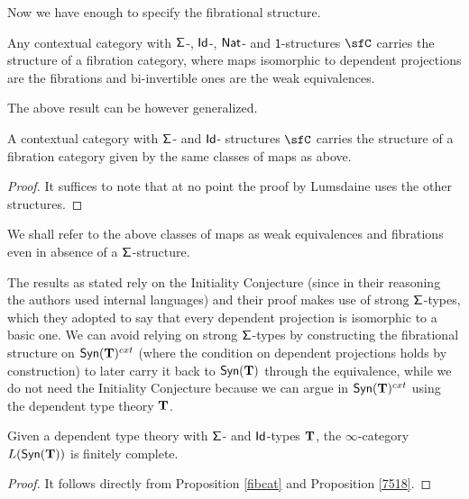 Now we have enough to specify the fibrational structure.

\begin{prop}
  Any contextual category with $\operatorname{\mathsf{\Sigma}}$-, $\operatorname{\mathsf{Id}}$-, $\operatorname{\mathsf{Nat}}$- and
  $\mathsf{1}$-structures $\sfC$ carries the structure of a fibration category,
  where maps isomorphic to dependent projections are the fibrations and
  bi-invertible ones are the weak equivalences.
\end{prop}

The above result can be however generalized.

\begin{prop}\label{fibcat}
  A contextual category with $\operatorname{\mathsf{\Sigma}}$- and $\operatorname{\mathsf{Id}}$- structures $\sfC$ carries
  the structure of a fibration category given by the same classes of maps as
  above.
\end{prop}
\begin{proof}
  It suffices to note that at no point the proof by Lumsdaine uses the other
  structures.
\end{proof}

\begin{rmk}
  We shall refer to the above classes of maps as weak equivalences and
  fibrations even in absence of a $\operatorname{\mathsf{\Sigma}}$-structure.
\end{rmk}

\begin{rmk}
  The results as stated rely on the Initiality Conjecture (since in their
  reasoning the authors used internal languages) and their proof makes use of
  strong $\operatorname{\mathsf{\Sigma}}$-types, which they adopted to say that every dependent
  projection is isomorphic to a basic one. We
  can avoid relying on strong $\operatorname{\mathsf{\Sigma}}$-types by constructing the fibrational
  structure on $\mathsf{Syn}(\mathbf{T})^{cxt}$ (where the condition on dependent projections
  holds by construction) to later carry it back to $\mathsf{Syn}(\mathbf{T})$ through the
  equivalence, while we do not need the Initiality Conjecture because we can
  argue in $\mathsf{Syn}(\mathbf{T})^{cxt}$ using the dependent type theory $\operatorname{\mathbf{T}}$.
\end{rmk}

\begin{cor}\label{fincompl1}
  Given a dependent type theory with $\operatorname{\mathsf{\Sigma}}$- and $\operatorname{\mathsf{Id}}$-types $\operatorname{\mathbf{T}}$, the
  $\infty$-category $L(\mathsf{Syn}(\mathbf{T}))$ is finitely complete.
\end{cor}
\begin{proof}
  It follows directly from Proposition \ref{fibcat} and Proposition \ref{7518}.
\end{proof}

